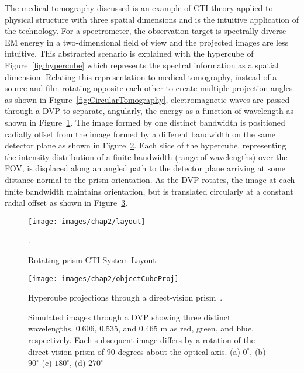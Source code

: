 The medical tomography discussed is an example of \ac{CTI} theory applied to physical structure with three spatial dimensions and is the intuitive application of the technology. For a spectrometer, the observation target is spectrally-diverse \acl{EM} energy in a two-dimensional field of view and the projected images are less intuitive. This abstracted scenario is explained with the hypercube of Figure~\ref{fig:hypercube} which represents the spectral information as a spatial dimension. Relating this representation to medical tomography, instead of a source and film rotating opposite each other to create multiple projection angles as shown in Figure~\ref{fig:CircularTomography}, electromagnetic waves are passed through a \ac{DVP} to separate, angularly, the energy as a function of wavelength as shown in Figure~\ref{fig:layout}. The image formed by one distinct bandwidth is positioned radially offset from the image formed by a different bandwidth on the same detector plane as shown in Figure~\ref{fig:objectCubeProj}. Each slice of the hypercube, representing the intensity distribution of a finite bandwidth (range of wavelengths) over the \ac{FOV}, is displaced along an angled path to the detector plane arriving at some distance normal to the prism orientation. As the \ac{DVP} rotates, the image at each finite bandwidth maintains orientation, but is translated circularly at a constant radial offset as shown in Figure~\ref{fig:DispAngles4}.
 
 \begin{figure}[htb]	%
\centering
\texttt{[image: images/chap2/layout]}
\caption{Rotating-prism CTI System Layout~\cite{Sue}}.
\label{fig:layout}
\end{figure}
 
\begin{figure}[htb]		%
\centering
\texttt{[image: images/chap2/objectCubeProj]}
\caption{Hypercube projections through a direct-vision prism~\cite{Sue}.}
\label{fig:objectCubeProj}
\end{figure}

\begin{figure}[h]		%
\begin{center}
\caption{\textmd{Simulated images through a \acl{DVP} showing three distinct wavelengths, 0.606, 0.535, and 0.465 \textmu m as red, green, and blue, respectively. Each subsequent image differs by a rotation of the direct-vision prism of 90 degrees about the optical axis. (a) $0^\circ$, (b) $90^\circ$ (c) $180^\circ$, (d) $270^\circ$}}
\label{fig:DispAngles4}
\end{center}
\end{figure}


